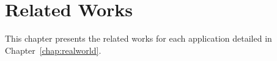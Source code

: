 \chapter{Related Works} \label{chap:relatedworks}

This chapter presents the related works for each application detailed in Chapter~\ref{chap:realworld}.





